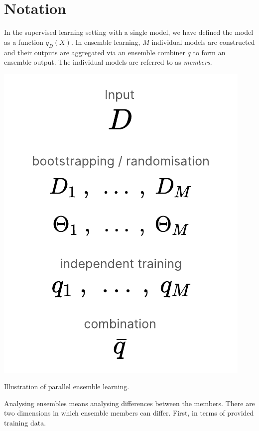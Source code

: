 \documentclass[
	twoside=false, %
]{kaobook}
\begin{document}
\section{Notation}
\label{sec:ensemble-learning-notation}

In the supervised learning setting with a single model, we have defined the model as a function $q_{D}(X)$. In ensemble learning, $M$ individual models are constructed and their outputs are aggregated via an ensemble combiner $\bar{q}$ to form an ensemble output. The individual models are referred to as \textit{members}. 

\begin{marginfigure}
  \includegraphics[width=\textwidth]{figma-illustrations/ensemble-learning.pdf}
  \caption{
    Illustration of parallel ensemble learning.
  }
\end{marginfigure}
Analysing ensembles means analysing differences between the members. There are two dimensions in which ensemble members can differ. First, in terms of provided training data. 
\end{document}
